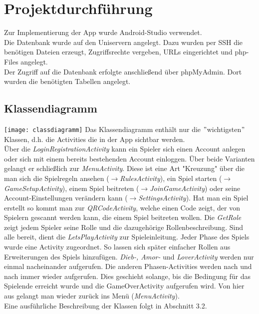 \documentclass[12pt, a4paper]{article}
\begin{document}




\section{Projektdurchführung}

Zur Implementierung der App wurde Android-Studio verwendet. \\
Die Datenbank wurde auf den Uniservern angelegt. Dazu wurden per SSH die benötigen Dateien erzeugt, Zugriffsrechte vergeben, URLs eingerichtet und php-Files angelegt.\\
Der Zugriff auf die Datenbank erfolgte anschließend über phpMyAdmin. Dort wurden die benötigten Tabellen angelegt.
		
	\subsection{Klassendiagramm}
		 
\texttt{[image: classdiagramm]} \newline \newline	
Das Klassendiagramm enthält nur die $"$wichtigsten$"$ Klassen, d.h. die Activities die in der App sichtbar werden.
\\ Über die \textit{LoginRegistrationActivity} kann ein Spieler sich einen Account anlegen oder sich mit einem bereits bestehenden Account einloggen. Über beide Varianten gelangt er schließlich zur \textit{MenuActivity}. Diese ist eine Art "Kreuzung" über die man sich die Spielregeln ansehen ($\rightarrow$\textit{RulesActivity}), ein Spiel starten ($\rightarrow$\textit{GameSetupActivity}), einem Spiel beitreten ($\rightarrow$\textit{JoinGameActivity}) oder seine Account-Einstellungen verändern kann ($\rightarrow$\textit{SettingsActivity}).
Hat man ein Spiel erstellt so kommt man zur \textit{QRCodeActivity}, welche einen Code zeigt, der von Spielern gescannt werden kann, die einem Spiel beitreten wollen.
Die \textit{GetRole} zeigt jedem Spieler seine Rolle und die dazugehörige Rollenbeschreibung. Sind alle bereit, dient die \textit{LetsPlayActivity} zur Spieleinleitung.
Jeder Phase des Spiels wurde eine Activity zugeordnet. So lassen sich später einfacher Rollen aus Erweiterungen des Spiels hinzufügen. \textit{Dieb-, Amor-} und \textit{LoverActivity} werden nur einmal nacheinander aufgerufen. Die anderen Phasen-Activities werden nach und nach immer wieder aufgerufen. Dies geschieht solange, bis die Bedingung für das Spielende erreicht wurde und die GameOverActivity aufgerufen wird. Von hier aus gelangt man wieder zurück ins Menü (\textit{MenuActivity}).
\\ Eine ausführliche Beschreibung der Klassen folgt in Abschnitt 3.2.
\end{document}
